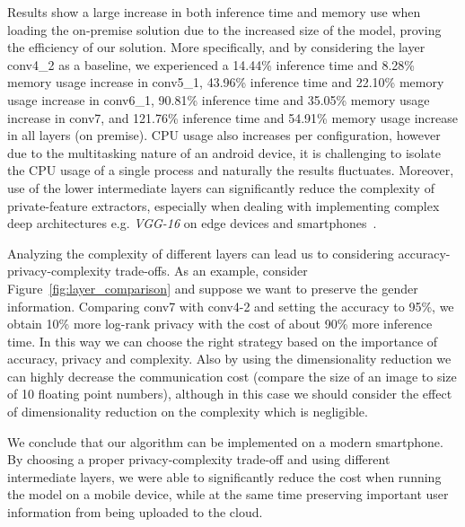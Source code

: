 \documentclass[10pt,journal,compsoc]{IEEEtran}
\begin{document}
Results show a large increase in both inference time and memory use when loading the on-premise solution due to the increased size of the model, proving the efficiency of our solution. More specifically, and by considering the layer conv4\_2 as a baseline, we experienced a 14.44\% inference time and 8.28\% memory usage increase in conv5\_1, 43.96\% inference time and 22.10\% memory usage increase in conv6\_1, 90.81\% inference time and 35.05\% memory usage increase in conv7, and 121.76\% inference time and 54.91\% memory usage increase in all layers (on premise). CPU usage also increases per configuration, however due to the multitasking nature of an android device, it is challenging to isolate the CPU usage of a single process and naturally the results fluctuates. Moreover, use of the lower intermediate layers can significantly reduce the complexity of private-feature extractors, especially when dealing with implementing complex deep architectures e.g. \emph{VGG-16} on edge devices and smartphones~\cite{kim2015compression}. 

Analyzing the complexity of different layers can lead us to considering accuracy-privacy-complexity trade-offs. As an example, consider Figure~\ref{fig:layer_comparison} and suppose we want to preserve the gender information. Comparing conv7 with conv4-2 and setting the accuracy to 95\%, we obtain 10\% more log-rank privacy with the cost of about 90\% more inference time. In this way we can choose the right strategy based on the importance of accuracy, privacy and complexity. Also by using the dimensionality reduction we can highly decrease the communication cost (compare the size of an image to size of 10 floating point numbers), although in this case we should consider the effect of dimensionality reduction on the complexity which is negligible.



We conclude that our algorithm can be implemented on a modern smartphone. By choosing a proper privacy-complexity trade-off and using different intermediate layers, we were able to significantly reduce the cost when running the model on a mobile device, while at the same time preserving important user information from being uploaded to the cloud.
\end{document}
